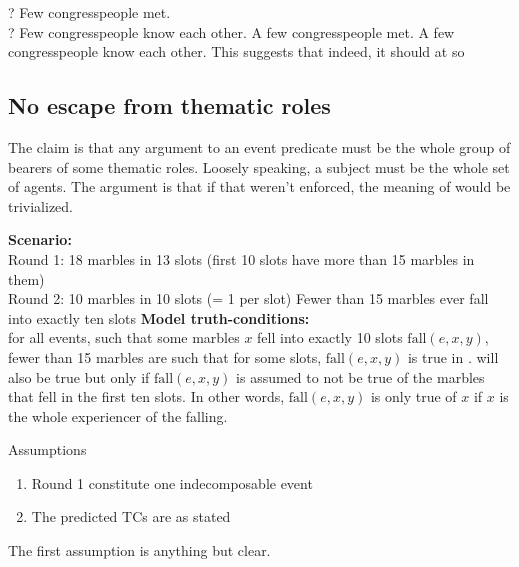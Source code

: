 \documentclass[english]{article}
\begin{document}
\pex
\a 
? Few congresspeople met.\\
? Few congresspeople know each other.
\a 
A few congresspeople met.
A few congresspeople know each other.
\xe
%
This suggests that indeed, it should at so

\subsection{No escape from thematic roles}

The claim is that any argument to an event predicate must be the whole group of bearers of some thematic roles. Loosely speaking, a subject must be the whole set of agents. The argument is that if that weren't enforced, the meaning of \cnextx would be trivialized.

\pex
\a \textbf{Scenario:} \\
Round 1: 18 marbles in 13 slots (first 10 slots have more than 15 marbles in them) \\
Round 2: 10 marbles in 10 slots (= 1 per slot)
\a Fewer than 15 marbles ever fall into exactly ten slots
\a \textbf{Model truth-conditions:} \\
for all events, such that some marbles $x$ fell into exactly 10 slots $\text{fall}(e, x, y)$,
fewer than 15 marbles are such that for some slots, $\text{fall}(e, x, y)$
\xe
%
 is true in .  will also be true but only if $\text{fall}(e, x, y)$ is assumed to not be true of the marbles that fell in the first ten slots. In other words, $\text{fall}(e, x, y)$ is only true of $x$ if $x$ is the whole experiencer of the falling.

\begin{boxy}{Assumptions}
\begin{enumerate}
\item Round 1 constitute one indecomposable event
\item The predicted TCs are as stated
\end{enumerate}
\end{boxy}
%
The first assumption is anything but clear. 
\end{document}
